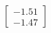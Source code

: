 \documentclass[preview]{standalone}
\begin{document}
\begin{align*}
\begin{bmatrix} -1.51 \\ -1.47 \end{bmatrix}
\end{align*}
\end{document}
